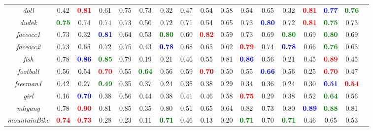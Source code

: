 \documentclass[preprint,12pt,review]{elsarticle}
\begin{document}
\begin{table*}[htp]
{\begin{tabular}{|c|c|c|c|c|c|c|c|c|c|c|c|c|c|c|c|c|}
%
\emph{doll}   &0.42  &\textcolor{red}{\textbf{0.81}}  &0.61 &0.75 &0.73   &0.32  &0.47  &0.54  &0.58  &0.54 &0.65 &0.32  &\textcolor{red}{\textbf{0.81}}  &\textcolor{blue}{\textbf{0.77}} &\textcolor{green}{\textbf{0.76}} \\
%
\emph{dudek}   &\textcolor{green}{\textbf{0.75}}   &0.74  &0.74 &0.73  &0.50 &0.72 &0.71 &0.54 &0.65 &0.73 &\textcolor{blue}{\textbf{0.80}} &0.72 &\textcolor{red}{\textbf{0.81}} &\textcolor{green}{\textbf{0.75}}  &0.73 \\
%
\emph{faceocc1}   &0.73   &0.32  &\textcolor{blue}{\textbf{0.81}} &0.64  &0.53  &\textcolor{green}{\textbf{0.80}}  &0.60  &\textcolor{red}{\textbf{0.82}} &0.59 &0.73  &0.69 &\textcolor{green}{\textbf{0.80} } &0.69  &\textcolor{green}{\textbf{0.80}} &0.69\\
%
\emph{faceocc2}  &0.73   &0.65  &0.72 &0.75 &0.43 &\textcolor{blue}{\textbf{0.78}}   &0.68  &0.65  &0.62 &\textcolor{red}{\textbf{0.79}} &0.74  &\textcolor{blue}{\textbf{0.78}}  &0.66 &\textcolor{green}{\textbf{0.76}} &0.63 \\
%
\emph{fish}   &0.78  &\textcolor{blue}{\textbf{0.86}}  &\textcolor{green}{\textbf{0.85}} &0.79  &0.19 &0.21  &0.46  &0.55  &0.81 &\textcolor{blue}{\textbf{0.86}} &0.56  &0.21  &0.45  &\textcolor{red}{\textbf{0.89}} &0.45\\
%
\emph{football}   &0.56  &0.54  &\textcolor{red}{\textbf{0.70}}  &0.55  &\textcolor{green}{\textbf{0.64}}  &0.56  &0.59 &\textcolor{red}{\textbf{0.70}} &0.50  &0.55  &\textcolor{blue}{\textbf{0.66}} &0.56  &0.25  &\textcolor{red}{\textbf{0.70}} &0.47 \\
%
\emph{freeman1}   &0.42   &0.27 &\textcolor{green}{\textbf{0.49}} &0.35 &0.37 &0.24 &0.35 &0.38 &0.29 &0.34  &0.36 &0.24  &0.30  &\textcolor{blue}{\textbf{0.51}} &\textcolor{red}{\textbf{0.54}} \\
%
\emph{girl}    &0.16   &\textcolor{blue}{\textbf{0.70}}  &0.38  &0.56  &0.44 &0.38  &0.41  &0.46 &0.58  &\textcolor{red}{\textbf{0.75}} &0.29 &0.38  &0.52  &\textcolor{green}{\textbf{0.64}} &0.56\\
%
\emph{mhyang}   &0.78  &\textcolor{red}{\textbf{0.90}}  &0.81 &0.85  &0.35 &0.80 &0.51 &0.65 &0.64 &0.82 &0.73 &0.80 &\textcolor{blue}{\textbf{0.89}}&\textcolor{green}{\textbf{0.88}}  &0.81\\
%
\emph{mountainBike}   &\textcolor{red}{\textbf{0.74}}   &\textcolor{red}{\textbf{0.73}}  &0.28 &0.23  &0.11 &\textcolor{green}{\textbf{0.71}}  &0.46  &0.13  &0.20 &\textcolor{green}{\textbf{0.71}}  &0.70  &\textcolor{green}{\textbf{0.71}}  &0.46 &0.65 &0.53 \\

\end{tabular}}
\end{table*}
\end{document}
